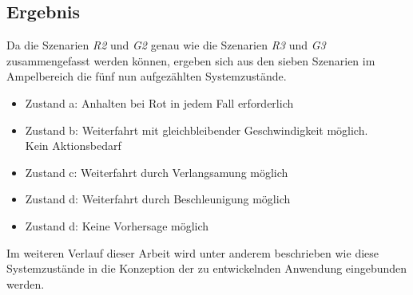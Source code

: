 \subsection*{Ergebnis}
Da die Szenarien \textit{R2} und \textit{G2} genau wie die Szenarien \textit{R3} und \textit{G3} zusammengefasst werden können, ergeben sich aus den sieben Szenarien im Ampelbereich die fünf nun aufgezählten Systemzustände.
\begin{itemize}
	\item Zustand a: Anhalten bei Rot in jedem Fall erforderlich
	\item Zustand b: Weiterfahrt mit gleichbleibender Geschwindigkeit möglich.\\ Kein Aktionsbedarf
	\item Zustand c: Weiterfahrt durch Verlangsamung möglich
	\item Zustand d: Weiterfahrt durch Beschleunigung möglich
	\item Zustand d: Keine Vorhersage möglich
\end{itemize}
Im weiteren Verlauf dieser Arbeit wird unter anderem beschrieben wie diese Systemzustände in die Konzeption der zu entwickelnden Anwendung eingebunden werden.
